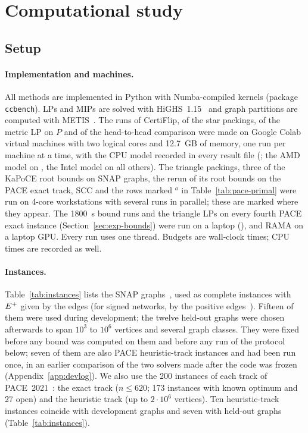 \section{Computational study}\label{sec:exp}

\subsection{Setup}\label{sec:exp-setup}

\paragraph{Implementation and machines.}  All methods are implemented in
Python with Numba-compiled kernels (package \texttt{ccbench}).  LPs and MIPs
are solved with HiGHS~1.15~\cite{HuangfuH18} and graph partitions are
computed with METIS~\cite{KarypisK98}.  The runs of CertiFlip, of the
star packings, of the metric LP on $P$ and of the head-to-head
comparison were made on Google Colab virtual machines with two logical cores
and \SI{12.7}{GB} of memory, one run per machine at a time, with the CPU model
recorded in every result file (\numCpuModels; the AMD model on
\numCpuAmd{}, the Intel model on all others).  The triangle packings, three of the
KaPoCE root bounds on SNAP graphs, the rerun of its root bounds on the PACE
exact track, SCC and the rows marked $^a$ in
Table~\ref{tab:pace-primal} were run on 4-core workstations with several runs
in parallel; these are marked where they appear.  The \SI{1800}{s} bound
runs and the triangle LPs on every fourth PACE exact instance
(Section~\ref{sec:exp-bounds}) were run on a laptop (\numCpuLocal), and RAMA
on a laptop GPU.  Every run uses one thread.
Budgets are wall-clock times; CPU times are recorded as well.

\paragraph{Instances.}  Table~\ref{tab:instances} lists the SNAP
graphs~\cite{LeskovecK14snap}, used as complete instances with $E^{+}$ given by
the edges (for signed networks, by the positive
edges~\cite{leskovec2010signedchi,kumar2016bitcoin}).  Fifteen of them were
used during development; the twelve held-out graphs were chosen afterwards to
span $10^3$ to $10^6$ vertices and several graph classes.  They were fixed
before any bound was computed on them and before any run of the protocol
below; seven of them are also PACE heuristic-track instances and had been run
once, in an earlier comparison of the two solvers made after the code was
frozen (Appendix~\ref{app:devlog}).  We also use the 200
instances of each track of PACE~2021~\cite{KellerhalsKNZ21pace}: the exact
track ($n\le620$; 173 instances with known optimum and 27 open) and the
heuristic track (up to $2\cdot10^6$ vertices).  Ten heuristic-track instances
coincide with development graphs and seven with held-out graphs
(Table~\ref{tab:instances}).

